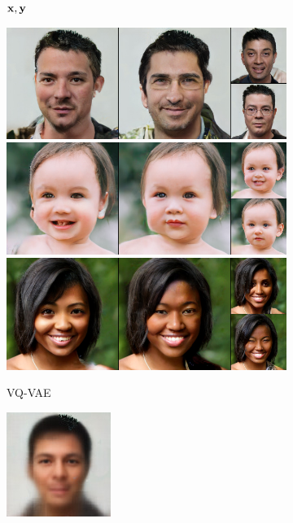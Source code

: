\begin{figure}[t]
\begin{subfigure}[t]{0.22\textwidth}
      \caption*{\scriptsize ${\mathbf{x}}, {\mathbf{y}}$}
    \end{subfigure}
    \begin{subfigure}[t]{0.25\textwidth}
      \centering
      \includegraphics[height=\ffhqimgheight]{figs/cigcvae/image-samples/ffhq256/freeform_vq_vae_0_samples.jpg}
      \includegraphics[height=\ffhqimgheight]{figs/cigcvae/image-samples/ffhq256/freeform_vq_vae_13_samples.jpg}
      \includegraphics[height=\ffhqimgheight]{figs/cigcvae/image-samples/ffhq256/freeform_vq_vae_32_samples.jpg}
      \caption{\scriptsize VQ-VAE}
    \end{subfigure}
    \begin{subfigure}[t]{0.25\textwidth}
      \centering
      \includegraphics[height=\ffhqimgheight]{figs/cigcvae/image-samples/ffhq256/freeform_ce_0_samples.jpg}\\

\end{subfigure}
\end{figure}

